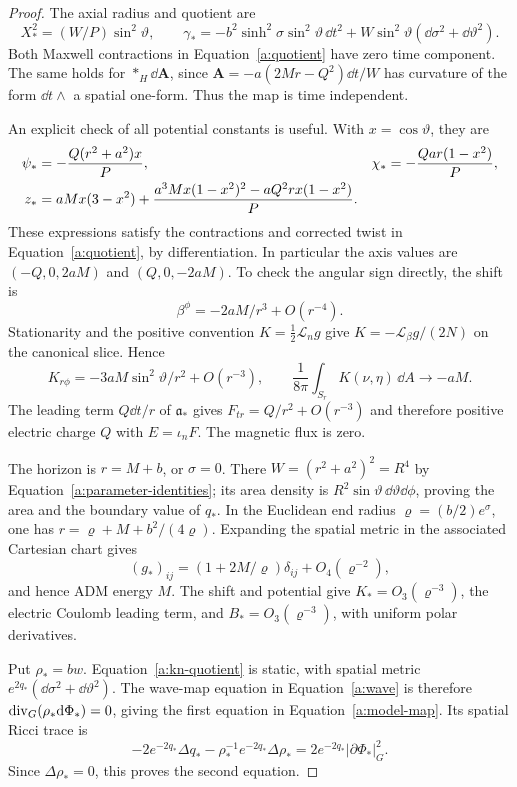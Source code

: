 \begin{proof}
The axial radius and quotient are
\begin{equation}\label{a:kn-quotient}
 X_*^2=(W/P)\sin^2\vartheta,
 \qquad
 \gamma_*=-b^2\sinh^2\sigma\sin^2\vartheta\,\dd t^2
                +W\sin^2\vartheta
                    (\dd\sigma^2+\dd\vartheta^2).
\end{equation}
Both Maxwell contractions in Equation~\eqref{a:quotient} have
zero time component.  The same holds for $*_H\dd\mathbf A$,
since $\mathbf A=-a(2Mr-Q^2)\dd t/W$ has curvature of the
form $\dd t\wedge$ a spatial one-form.  Thus the map is
time independent.

An explicit check of all potential constants is useful.  With
$x=\cos\vartheta$, they are
\begin{align}\label{a:kn-potentials}
 \psi_*&=-\frac{Q(r^2+a^2)x}{P},&
 \chi_*&=-\frac{Qar(1-x^2)}P,\notag\\
 z_*&=aMx(3-x^2)
       +\frac{a^3Mx(1-x^2)^2-aQ^2rx(1-x^2)}P.&&
\end{align}
These expressions satisfy the contractions and corrected twist
in Equation~\eqref{a:quotient}, by differentiation.  In
particular the axis values are $(-Q,0,2aM)$ and
$(Q,0,-2aM)$.  To check the angular sign directly, the shift is
\[
 \beta^\phi=-2aM/r^3+O(r^{-4}).
\]
Stationarity and the positive convention $K=\tfrac12\mathcal L_ng$
give $K=-\mathcal L_\beta g/(2N)$ on the canonical slice.
Hence
\[
 K_{r\phi}=-3aM\sin^2\vartheta/r^2+O(r^{-3}),
 \qquad
 \frac1{8\pi}\int_{S_r}K(\nu,\eta)\,\dd A\longrightarrow-aM.
\]
The leading term $Q\dd t/r$ of $\mathfrak a_*$ gives
$F_{tr}=Q/r^2+O(r^{-3})$ and therefore positive electric charge
$Q$ with $E=\iota_nF$.  The magnetic flux is zero.

The horizon is $r=M+b$, or $\sigma=0$.  There
$W=(r^2+a^2)^2=R^4$ by
Equation~\eqref{a:parameter-identities}; its area density is
$R^2\sin\vartheta\,\dd\vartheta\dd\phi$, proving the area
and the boundary value of $q_*$.  In the Euclidean end radius
$\varrho=(b/2)e^\sigma$, one has
$r=\varrho+M+b^2/(4\varrho)$.  Expanding the spatial metric
in the associated Cartesian chart gives
\[
 (g_*)_{ij}=(1+2M/\varrho)\delta_{ij}+O_4(\varrho^{-2}),
\]
and hence ADM energy $M$.  The shift and potential give
$K_*=O_3(\varrho^{-3})$, the electric Coulomb leading term,
and $B_*=O_3(\varrho^{-3})$, with uniform polar derivatives.

Put $\rho_*=bw$.  Equation~\eqref{a:kn-quotient} is static,
with spatial metric $e^{2q_*}(\dd\sigma^2+\dd\vartheta^2)$.
The wave-map equation in Equation~\eqref{a:wave} is therefore
$\operatorname{div}_G(\rho_*\mathrm d\Phi_*)=0$, giving the first equation in
Equation~\eqref{a:model-map}.  Its spatial Ricci trace is
\[
 -2e^{-2q_*}\Delta q_*
      -\rho_*^{-1}e^{-2q_*}\Delta\rho_*
          =2e^{-2q_*}|\partial\Phi_*|_G^2.
\]
Since $\Delta\rho_*=0$, this proves the second equation.


\end{proof}
